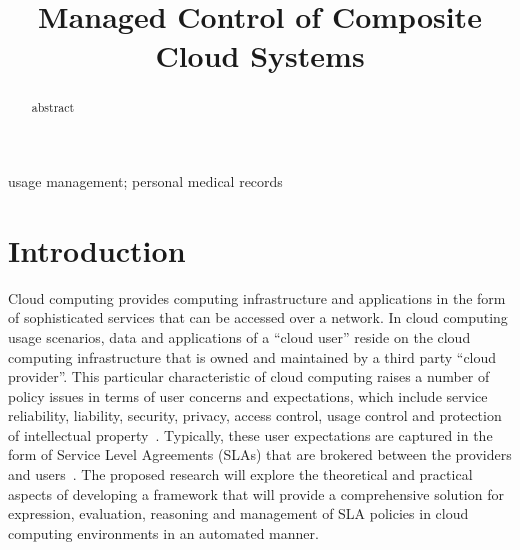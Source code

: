 \documentclass[10pt, conference, compsoc]{IEEEtran}
\begin{document}
%
\title{Managed Control of Composite Cloud Systems}


\author{
}

\maketitle


\begin{abstract}
abstract
\end{abstract}

\begin{IEEEkeywords}
usage management; personal medical records
\end{IEEEkeywords}

\IEEEpeerreviewmaketitle

\section{Introduction}
Cloud computing provides computing infrastructure and applications in the form of sophisticated services that can be accessed over a network. In cloud computing usage scenarios,  data and applications  of a ``cloud user'' reside on the cloud computing infrastructure that is owned and maintained by a third party ``cloud provider''.  This particular characteristic of cloud computing raises a number of policy issues in terms of user concerns and expectations, which include service reliability, liability, security, privacy, access control, usage control and protection of intellectual property~\cite{JeLiGr:08}.  Typically, these user expectations are captured in the form of Service Level Agreements (SLAs) that are brokered between the providers and users~\cite{BuYeVeBrBr:09}. The proposed research will explore the theoretical and practical aspects of developing a framework that will provide a comprehensive solution for expression, evaluation, reasoning and management of SLA policies in cloud computing environments in an automated manner. 
\end{document}
